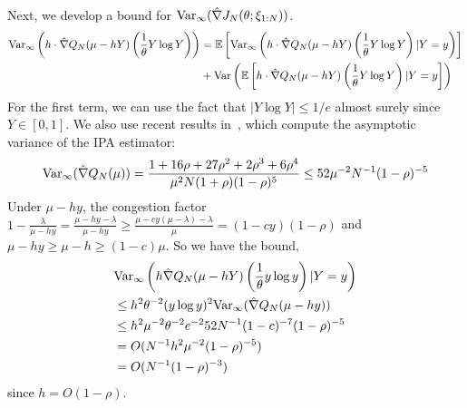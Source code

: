 Next, we develop a bound for ${\rm Var}_{\infty} (\hat{\nabla} J_{N}(\theta; \xi_{1:N}))$.
\begin{align*}
    {\rm Var}_{\infty}\left(
    h \cdot \hat{\nabla} Q_{N}(\mu - h Y) \left( \frac{1}{\theta} Y \log Y \right)
    \right)&=
    \mathbb{E}\left[{\rm Var}_{\infty}\left(h \cdot \hat{\nabla} Q_{N}(\mu - h Y) \left( \frac{1}{\theta} Y \log Y \right)|Y=y\right)\right]\\
&+{\rm Var}\left(\mathbb{E}\left[h \cdot \hat{\nabla} Q_{N}(\mu - h Y) \left( \frac{1}{\theta} Y \log Y \right)|Y = y\right]\right)
\end{align*}
For the first term, we can use the fact that $|Y\log Y| \leq 1/e$ almost surely since $Y\in[0,1]$. We also use recent results in~\cite{hu2023comparison}, which compute the asymptotic variance of the IPA estimator:
\[
{\rm Var}_{\infty}(\hat{\nabla} Q_{N}(\mu)) = \frac{1 + 16\rho + 27 \rho^{2} + 2 \rho^{3} + 6\rho^{4}}{\mu^{2}N(1 + \rho)(1-\rho)^{5}} \leq 52\mu^{-2}N^{-1}(1-\rho)^{-5}
\]
Under $\mu - hy$, the congestion factor $1 - \frac{\lambda}{\mu - hy} = \frac{\mu - hy - \lambda}{\mu - hy} \geq \frac{\mu - cy(\mu - \lambda) - \lambda}{\mu} = (1-cy)(1-\rho)$ and $\mu-hy\geq \mu-h\geq (1-c)\mu$.
So we have the bound,
\begin{align*}
 &{\rm Var}_{\infty}\left(h\hat{\nabla} Q_{N}(\mu - h Y) \left( \frac{1}{\theta} y \log y\right)|Y=y\right) \\
 & \leq  h^{2} \theta^{-2}(y \log y)^{2}{\rm Var}_{\infty}(\hat{\nabla} Q_{N}(\mu - h y)) \\
 & \leq h^{2}\mu^{-2}\theta^{-2}e^{-2} 52N^{-1}(1-c)^{-7}(1-\rho)^{-5} \\
 & = O(N^{-1} h^{2} \mu^{-2} (1-\rho)^{-5}) \\
 &= O(N^{-1}  (1-\rho)^{-3})
\end{align*}
since $h = O(1-\rho)$.

